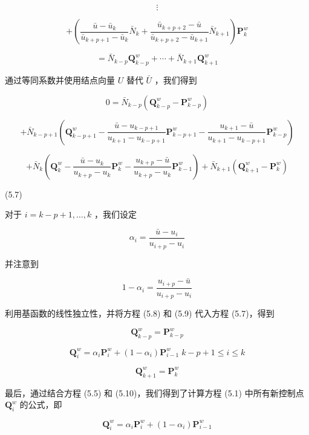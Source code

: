 \documentclass[../main.tex]{subfiles}
\begin{document}
\[
\vdots
\]

\[
+ \left( {\frac{\bar{u} - {\bar{u}}_{k}}{{\bar{u}}_{k + p + 1} - {\bar{u}}_{k}}{\bar{N}}_{k} + \frac{{\bar{u}}_{k + p + 2} - \bar{u}}{{\bar{u}}_{k + p + 2} - {\bar{u}}_{k + 1}}{\bar{N}}_{k + 1}}\right) {\mathbf{P}}_{k}^{w}
\]

\[
= {\bar{N}}_{k - p}{\mathbf{Q}}_{k - p}^{w} + \cdots  + {\bar{N}}_{k + 1}{\mathbf{Q}}_{k + 1}^{w}
\]

通过等同系数并使用结点向量 \(U\) 替代 \(\bar{U}\) ，我们得到

\[
0 = {\bar{N}}_{k - p}\left( {{\mathbf{Q}}_{k - p}^{w} - {\mathbf{P}}_{k - p}^{w}}\right)
\]

\[
+ {\bar{N}}_{k - p + 1}\left( {{\mathbf{Q}}_{k - p + 1}^{w} - \frac{\bar{u} - {u}_{k - p + 1}}{{u}_{k + 1} - {u}_{k - p + 1}}{\mathbf{P}}_{k - p + 1}^{w} - \frac{{u}_{k + 1} - \bar{u}}{{u}_{k + 1} - {u}_{k - p + 1}}{\mathbf{P}}_{k - p}^{w}}\right)
\]

\[
+ {\bar{N}}_{k}\left( {{\mathbf{Q}}_{k}^{w} - \frac{\bar{u} - {u}_{k}}{{u}_{k + p} - {u}_{k}}{\mathbf{P}}_{k}^{w} - \frac{{u}_{k + p} - \bar{u}}{{u}_{k + p} - {u}_{k}}{\mathbf{P}}_{k - 1}^{w}}\right)  + {\bar{N}}_{k + 1}\left( {{\mathbf{Q}}_{k + 1}^{w} - {\mathbf{P}}_{k}^{w}}\right)
\]

(5.7)

对于 \(i = k - p + 1,\ldots ,k\) ，我们设定

\[
{\alpha }_{i} = \frac{\bar{u} - {u}_{i}}{{u}_{i + p} - {u}_{i}} \tag{5.8}
\]

并注意到

\[
1 - {\alpha }_{i} = \frac{{u}_{i + p} - \bar{u}}{{u}_{i + p} - {u}_{i}} \tag{5.9}
\]

利用基函数的线性独立性，并将方程 (5.8) 和 (5.9) 代入方程 (5.7)，得到

\[
{\mathbf{Q}}_{k - p}^{w} = {\mathbf{P}}_{k - p}^{w}
\]

\[
{\mathbf{Q}}_{i}^{w} = {\alpha }_{i}{\mathbf{P}}_{i}^{w} + \left( {1 - {\alpha }_{i}}\right) {\mathbf{P}}_{i - 1}^{w}\;k - p + 1 \leq  i \leq  k
\]

\[
{\mathbf{Q}}_{k + 1}^{w} = {\mathbf{P}}_{k}^{w} \tag{5.10}
\]

最后，通过结合方程 (5.5) 和 (5.10)，我们得到了计算方程 (5.1) 中所有新控制点 \({\mathbf{Q}}_{i}^{w}\) 的公式，即

\[
{\mathbf{Q}}_{i}^{w} = {\alpha }_{i}{\mathbf{P}}_{i}^{w} + \left( {1 - {\alpha }_{i}}\right) {\mathbf{P}}_{i - 1}^{w} \tag{5.11}
\]
\end{document}
